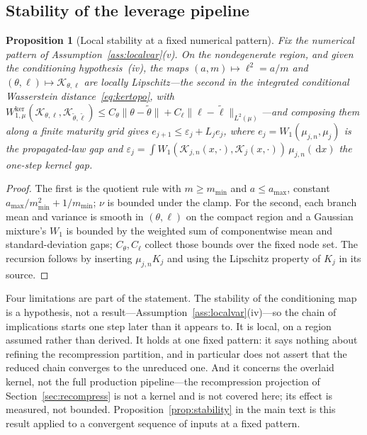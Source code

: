 \documentclass[11pt]{article}
\newtheorem{proposition}[theorem]{Proposition}
\newcommand{\cK}{\mathcal{K}}
\providecommand{\1}{\mathbf 1}
\newcommand{\dd}{\,\mathrm{d}}
\begin{document}
\subsection{Stability of the leverage pipeline}

\begin{proposition}[Local stability at a fixed numerical pattern]
\label{thm:kernel}\label{thm:condvar}\label{thm:leverage}\label{thm:propagation}
Fix the numerical pattern of Assumption~\ref{ass:localvar}(v). On the nondegenerate region, and
given the conditioning hypothesis~(iv), the maps $(a,m)\mapsto\ell^2=a/m$ and
$(\theta,\ell)\mapsto\cK_{\theta,\ell}$ are locally Lipschitz---the second in the integrated
conditional Wasserstein distance~\eqref{eq:kertopo}, with
$W_{1,\mu}^{\mathrm{ker}}(\cK_{\theta,\ell},\cK_{\tilde\theta,\tilde\ell})\le
C_\theta\|\theta-\tilde\theta\|+C_\ell\|\ell-\tilde\ell\|_{L^2(\mu)}$---and composing them along a
finite maturity grid gives $e_{j+1}\le\varepsilon_j+L_je_j$, where $e_j=W_1(\mu_{j,n},\mu_j)$ is the
propagated-law gap and $\varepsilon_j=\int W_1(\cK_{j,n}(x,\cdot),\cK_j(x,\cdot))\,\mu_{j,n}(\dd x)$
the one-step kernel gap.
\end{proposition}

\begin{proof}
The first is the quotient rule with $m\ge m_{\min}$ and $a\le a_{\max}$, constant
$a_{\max}/m_{\min}^2+1/m_{\min}$; $\nu$ is bounded under the clamp. For the second, each branch mean
and variance is smooth in $(\theta,\ell)$ on the compact region and a Gaussian mixture's $W_1$ is
bounded by the weighted sum of componentwise mean and standard-deviation gaps; $C_\theta,C_\ell$
collect those bounds over the fixed node set. The recursion follows by inserting $\mu_{j,n}K_j$ and using the Lipschitz property
of $K_j$ in its source.
\end{proof}

\noindent Four limitations are part of the statement. The stability of the conditioning map is a
hypothesis, not a result---Assumption~\ref{ass:localvar}(iv)---so the chain of implications starts
one step later than it appears to. It is local, on a region assumed rather than derived. It holds at one fixed pattern: it says nothing about refining the recompression partition,
and in particular does not assert that the reduced chain converges to the unreduced one. And it
concerns the overlaid kernel, not the full production pipeline---the recompression projection of
Section~\ref{sec:recompress} is not a kernel and is not covered here; its effect is measured, not
bounded. Proposition~\ref{prop:stability} in the main text is this result applied to a convergent
sequence of inputs at a fixed pattern.
\end{document}
